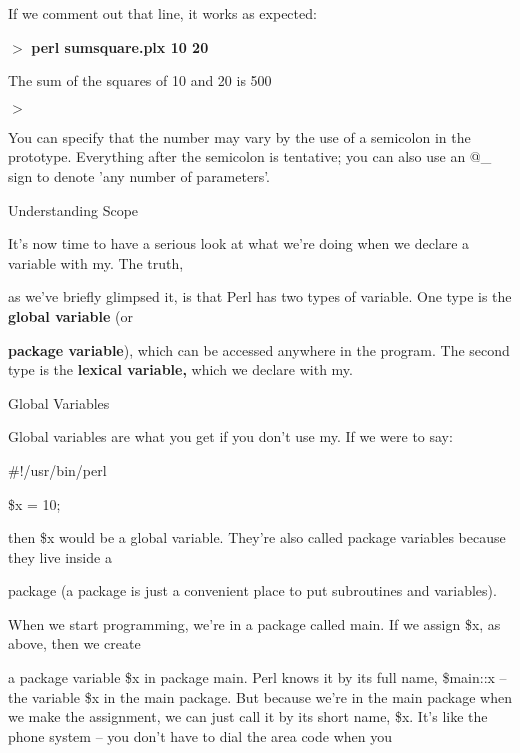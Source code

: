 \documentclass[a4paper,11pt]{book}
\begin{document}
\noindent 

\noindent If we comment out that line, it works as expected:

\noindent 

\noindent $>$ \textbf{perl sumsquare.plx 10 20}

\noindent The sum of the squares of 10 and 20 is 500

\noindent $>$

\noindent 

\noindent You can specify that the number may vary by the use of a semicolon in the prototype. Everything after the semicolon is tentative; you can also use an @\_ sign to denote 'any number of parameters'.

\noindent 

\noindent 

\noindent Understanding Scope

\noindent 

\noindent It's now time to have a serious look at what we're doing when we declare a variable with my. The truth,

\noindent as we've briefly glimpsed it, is that Perl has two types of variable. One type is the \textbf{global variable }(or

\noindent \textbf{package variable}), which can be accessed anywhere in the program. The second type is the \textbf{lexical variable, }which we declare with my.

\noindent 

\noindent Global Variables

\noindent 

\noindent Global variables are what you get if you don't use my. If we were to say:

\noindent 

\noindent \#!/usr/bin/perl

\noindent \$x = 10;

\noindent 

\noindent 

\noindent then \$x would be a global variable. They're also called package variables because they live inside a

\noindent package (a package is just a convenient place to put subroutines and variables).

\noindent 

\noindent When we start programming, we're in a package called main. If we assign \$x, as above, then we create

\noindent a package variable \$x in package main. Perl knows it by its full name, \$main::x -- the variable \$x in the main package. But because we're in the main package when we make the assignment, we can just call it by its short name, \$x. It's like the phone system -- you don't have to dial the area code when you
\end{document}
